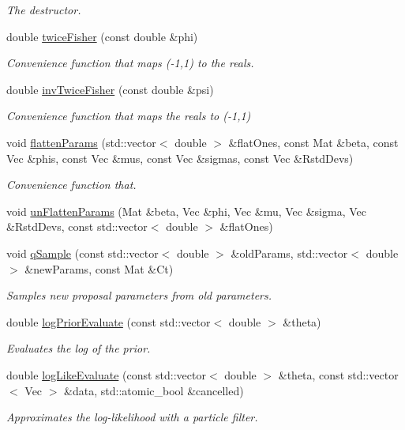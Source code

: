 \begin{DoxyCompactItemize}
\begin{DoxyCompactList}\small\item\em The destructor. \end{DoxyCompactList}\item 
double \hyperlink{classAdaPmmhJacApf_ac212a77c77dc6324e6770bac6f144a44}{twice\+Fisher} (const double \&phi)
\begin{DoxyCompactList}\small\item\em Convenience function that maps (-\/1,1) to the reals. \end{DoxyCompactList}\item 
double \hyperlink{classAdaPmmhJacApf_a7249ec92d715c2590ee9b21e6386ccd6}{inv\+Twice\+Fisher} (const double \&psi)
\begin{DoxyCompactList}\small\item\em Convenience function that maps the reals to (-\/1,1) \end{DoxyCompactList}\item 
void \hyperlink{classAdaPmmhJacApf_a20c1724b58bd9381eb01c4df89100d8c}{flatten\+Params} (std\+::vector$<$ double $>$ \&flat\+Ones, const Mat \&beta, const Vec \&phis, const Vec \&mus, const Vec \&sigmas, const Vec \&Rstd\+Devs)
\begin{DoxyCompactList}\small\item\em Convenience function that. \end{DoxyCompactList}\item 
void \hyperlink{classAdaPmmhJacApf_a26fb3107b52c792a5c3310bb5b691faa}{un\+Flatten\+Params} (Mat \&beta, Vec \&phi, Vec \&mu, Vec \&sigma, Vec \&Rstd\+Devs, const std\+::vector$<$ double $>$ \&flat\+Ones)
\item 
void \hyperlink{classAdaPmmhJacApf_a2795564d301ca962546d346ded5a6de3}{q\+Sample} (const std\+::vector$<$ double $>$ \&old\+Params, std\+::vector$<$ double $>$ \&new\+Params, const Mat \&Ct)
\begin{DoxyCompactList}\small\item\em Samples new proposal parameters from old parameters. \end{DoxyCompactList}\item 
double \hyperlink{classAdaPmmhJacApf_aa1f2e89ec6eca819fbb07b6e1624a01a}{log\+Prior\+Evaluate} (const std\+::vector$<$ double $>$ \&theta)
\begin{DoxyCompactList}\small\item\em Evaluates the log of the prior. \end{DoxyCompactList}\item 
double \hyperlink{classAdaPmmhJacApf_aaf13b2e2140668a537b964ba87a81c26}{log\+Like\+Evaluate} (const std\+::vector$<$ double $>$ \&theta, const std\+::vector$<$ Vec $>$ \&data, std\+::atomic\+\_\+bool \&cancelled)
\begin{DoxyCompactList}\small\item\em Approximates the log-\/likelihood with a particle filter. \end{DoxyCompactList}\end{DoxyCompactItemize}
